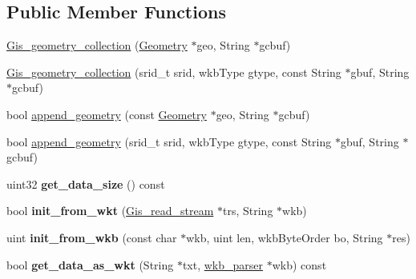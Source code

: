 \subsection*{Public Member Functions}
\begin{DoxyCompactItemize}
\item 
\mbox{\hyperlink{classGis__geometry__collection_a744bd0c768fb2b195a9917483071c2a0}{Gis\+\_\+geometry\+\_\+collection}} (\mbox{\hyperlink{classGeometry}{Geometry}} $\ast$geo, String $\ast$gcbuf)
\item 
\mbox{\hyperlink{classGis__geometry__collection_adfa2c5172a88f12e6e01767e6ca30eb5}{Gis\+\_\+geometry\+\_\+collection}} (srid\+\_\+t srid, wkb\+Type gtype, const String $\ast$gbuf, String $\ast$gcbuf)
\item 
bool \mbox{\hyperlink{classGis__geometry__collection_aa3fb89e6bc5f0650de26623dff708062}{append\+\_\+geometry}} (const \mbox{\hyperlink{classGeometry}{Geometry}} $\ast$geo, String $\ast$gcbuf)
\item 
bool \mbox{\hyperlink{classGis__geometry__collection_a1d5004c2016dfb12bd2e810538f35569}{append\+\_\+geometry}} (srid\+\_\+t srid, wkb\+Type gtype, const String $\ast$gbuf, String $\ast$gcbuf)
\item 
\mbox{\label{classGis__geometry__collection_afcc6e3a64c2063f81084e282aa40f684}} 
uint32 {\bfseries get\+\_\+data\+\_\+size} () const
\item 
\mbox{\label{classGis__geometry__collection_a954252286ee397c2facca903c3f32f04}} 
bool {\bfseries init\+\_\+from\+\_\+wkt} (\mbox{\hyperlink{classGis__read__stream}{Gis\+\_\+read\+\_\+stream}} $\ast$trs, String $\ast$wkb)
\item 
\mbox{\label{classGis__geometry__collection_a6ef031a45d65ca3234c779e1116035ad}} 
uint {\bfseries init\+\_\+from\+\_\+wkb} (const char $\ast$wkb, uint len, wkb\+Byte\+Order bo, String $\ast$res)
\item 
\mbox{\label{classGis__geometry__collection_aa964f71f4ec2b24562486750ad5fc731}} 
bool {\bfseries get\+\_\+data\+\_\+as\+\_\+wkt} (String $\ast$txt, \mbox{\hyperlink{classGeometry_1_1wkb__parser}{wkb\+\_\+parser}} $\ast$wkb) const
\item 
\mbox{\label{classGis__geometry__collection_aabfb15eb5b90ac63c060926935381b7c}} 

\end{DoxyCompactItemize}
